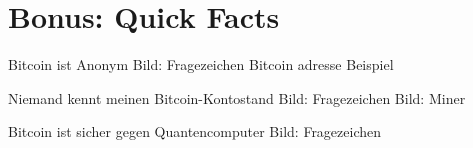 \documentclass[aspectratio=169]{beamer}
\begin{document}





\section{Bonus: Quick Facts}


\begin{frame}{Bitcoin ist Anonym}
    Bild: Fragezeichen
    \pause
    Bitcoin adresse Beispiel
\end{frame}


\begin{frame}{Niemand kennt meinen Bitcoin-Kontostand}
    Bild: Fragezeichen
    \pause
    Bild: Miner
\end{frame}


\begin{frame}{Bitcoin ist sicher gegen Quantencomputer}
    Bild: Fragezeichen
\end{frame}
\end{document}
